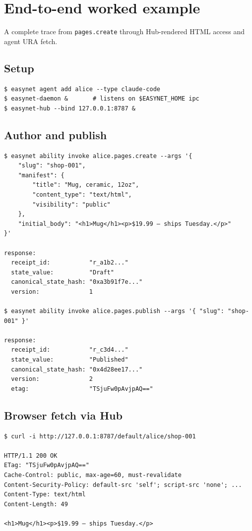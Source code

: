 \documentclass[11pt,a4paper]{article}
\theoremstyle{definition}
\begin{document}
\section{End-to-end worked example}
\label{sec:e2e}

A complete trace from \texttt{pages.create} through Hub-rendered
HTML access and agent URA fetch.

\subsection{Setup}

\begin{lstlisting}
$ easynet agent add alice --type claude-code
$ easynet-daemon &       # listens on $EASYNET_HOME ipc
$ easynet-hub --bind 127.0.0.1:8787 &
\end{lstlisting}

\subsection{Author and publish}

\begin{lstlisting}
$ easynet ability invoke alice.pages.create --args '{
    "slug": "shop-001",
    "manifest": {
        "title": "Mug, ceramic, 12oz",
        "content_type": "text/html",
        "visibility": "public"
    },
    "initial_body": "<h1>Mug</h1><p>$19.99 — ships Tuesday.</p>"
}'

response:
  receipt_id:           "r_a1b2..."
  state_value:          "Draft"
  canonical_state_hash: "0xa3b91f7e..."
  version:              1

$ easynet ability invoke alice.pages.publish --args '{ "slug": "shop-001" }'

response:
  receipt_id:           "r_c3d4..."
  state_value:          "Published"
  canonical_state_hash: "0x4d28ee17..."
  version:              2
  etag:                 "TSjuFw0pAvjpAQ=="
\end{lstlisting}

\subsection{Browser fetch via Hub}

\begin{lstlisting}
$ curl -i http://127.0.0.1:8787/default/alice/shop-001

HTTP/1.1 200 OK
ETag: "TSjuFw0pAvjpAQ=="
Cache-Control: public, max-age=60, must-revalidate
Content-Security-Policy: default-src 'self'; script-src 'none'; ...
Content-Type: text/html
Content-Length: 49

<h1>Mug</h1><p>$19.99 — ships Tuesday.</p>
\end{lstlisting}
\end{document}
